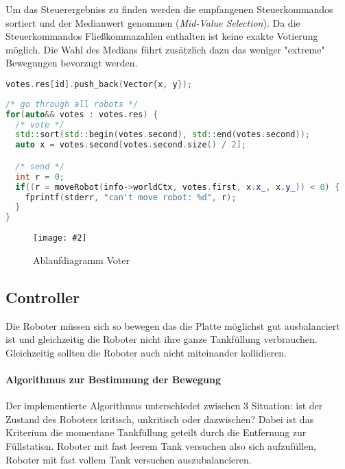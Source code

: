 \documentclass[
    12pt,
    bibliography=totoc,
    ngerman,
    enabledeprecatedfontcommands
]{scrartcl}
\newcommand{\includevisio}[2][]{\texttt{[image: \#2]}}
\begin{document}
{Um das Steuerergebniss zu finden werden die empfangenen Steuerkommandos sortiert und der Medianwert genommen (\textit{Mid-Value Selection}). Da die Steuerkommandos
Flie{\ss}kommazahlen enthalten ist keine exakte Votierung m{\"{o}}glich. Die Wahl des Medians f{\"{u}}hrt zus{\"{a}}tzlich dazu das weniger "extreme" Bewegungen bevorzugt werden.
\noindent\begin{minipage}{.30\textwidth}
\begin{lstlisting}[caption=Sammeln, frame=tlrb, language=c++]
votes.res[id].push_back(Vector{x, y});
\end{lstlisting}
\end{minipage}\hfill
\begin{minipage}{.60\textwidth}
\begin{lstlisting}[caption=Auswahl, frame=tlrb, language=c++]
/* go through all robots */
for(auto&& votes : votes.res) {
  /* vote */
  std::sort(std::begin(votes.second), std::end(votes.second));
  auto x = votes.second[votes.second.size() / 2];

  /* send */
  int r = 0;
  if((r = moveRobot(info->worldCtx, votes.first, x.x_, x.y_)) < 0) {
  	fprintf(stderr, "can't move robot: %d", r);
  }
}
\end{lstlisting}
\end{minipage}


\begin{figure}
	\centering
	\includevisio[width=\textwidth]{seqvoter}
	\caption{Ablaufdiagramm Voter}
	\label{fig:sequence-voter}
\end{figure}
\clearpage %

\subsection{Controller}\label{controller}
Die Roboter m{\"{u}}ssen sich so bewegen das die Platte m{\"{o}}glichst gut ausbalanciert
ist und gleichzeitig die Roboter nicht ihre ganze Tankf{\"{u}}llung verbrauchen. Gleichzeitig sollten die Roboter auch nicht miteinander
kollidieren.

\paragraph{Algorithmus zur Bestimmung der Bewegung} Der implementierte Algorithmus unterschiedet zwischen 3 Situation: ist der Zustand des Roboters kritisch,
unkritisch oder dazwischen? Dabei ist das Kriterium die momentane Tankf{\"{u}}llung geteilt durch die Entfernung zur F{\"{u}}llstation. Roboter mit fast leerem Tank
versuchen also sich aufzuf{\"{u}}llen, Roboter mit fast vollem Tank versuchen auszubalancieren.

}
\end{document}
